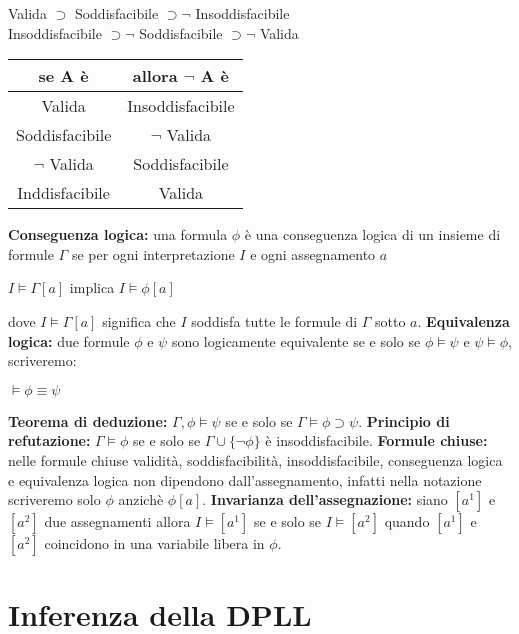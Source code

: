 \documentclass[../main.tex]{subfiles}
\begin{document}
   \begin{center}
      Valida $\supset$ Soddisfacibile $\supset \lnot$ Insoddisfacibile\\
      \vspace{4ex}
      Insoddisfacibile $\supset \lnot$ Soddisfacibile $\supset \lnot$ Valida\\
      \vspace{4ex}
      \begin{tabular}{c c}
         \hline
         se A è & allora $\lnot$ A è\\
         \hline
         \hline
         Valida & Insoddisfacibile\\
         Soddisfacibile & $\lnot$ Valida\\
         $\lnot$ Valida & Soddisfacibile\\
         Inddisfacibile & Valida
      \end{tabular}
   \end{center}
   \textbf{Conseguenza logica:} una formula $\phi$ è una conseguenza logica di un insieme di formule $\Gamma$  se per ogni interpretazione $I$ e ogni assegnamento $a$
   \begin{center}
      $I \models \Gamma [a]$ implica $I \models \phi [a]$
   \end{center}
   dove $I \models \Gamma [a]$ significa che $I$ soddisfa tutte le formule di $\Gamma$ sotto $a$.
   \spazio
   \textbf{Equivalenza logica:} due formule $\phi$ e $\psi$ sono logicamente equivalente se e solo se $\phi \models \psi$ e $\psi \models \phi$, scriveremo:
   \begin{center}
      $\models \phi \equiv \psi$
   \end{center}
   \textbf{Teorema di deduzione:} $\Gamma , \phi \models \psi$ se e solo se $\Gamma \models \phi \supset \psi$.
   \spazio
   \textbf{Principio di refutazione:} $\Gamma \models \phi$ se e solo se $\Gamma \cup \{ \lnot \phi \}$ è insoddisfacibile.
   \spazio
   \textbf{Formule chiuse:} nelle formule chiuse validità, soddisfacibilità, insoddisfacibile, conseguenza logica e equivalenza logica non dipendono dall'assegnamento, infatti nella notazione scriveremo solo $\phi$ anzichè $\phi[a]$.
   \spazio
   \textbf{Invarianza dell'assegnazione:} siano $[a^1]$ e $[a^2]$ due assegnamenti allora $I \models [a^1]$ se e solo se $I \models [a^2]$ quando $[a^1]$ e $[a^2]$ coincidono in una variabile libera in $\phi$.

   \chapter{Inferenza della DPLL}
\end{document}
